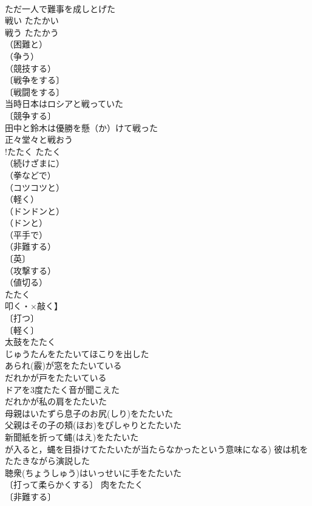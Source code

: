 \documentclass[8pt]{extreport}
\begin{document}
\begin{CJK}{UTF8}{min}
\\	ただ一人で難事を成しとげた 
\\	戦い	たたかい	
\\	戦う	たたかう	
\\	（困難と）
\\	（争う）
\\	（競技する）
\\	〔戦争をする〕
\\	〔戦闘をする〕
\\	当時日本はロシアと戦っていた 
\\	〔競争する〕
\\	田中と鈴木は優勝を懸（か）けて戦った 
\\	正々堂々と戦おう 
\\	!たたく	たたく	
\\	（続けざまに）
\\	（拳などで）
\\	（コツコツと）
\\	（軽く）
\\	（ドンドンと）
\\	（ドンと）
\\	（平手で）
\\	（非難する）
\\	〔英〕
\\	（攻撃する）
\\	（値切る）
\\	たたく
\\	叩く・×敲く】 
\\	〔打つ〕
\\	〔軽く〕
\\	太鼓をたたく 
\\	じゅうたんをたたいてほこりを出した 
\\	あられ(霰)が窓をたたいている 
\\	だれかが戸をたたいている 
\\	ドアを3度たたく音が聞こえた 
\\	だれかが私の肩をたたいた 
\\	母親はいたずら息子のお尻(しり)をたたいた 
\\	父親はその子の頬(ほお)をぴしゃりとたたいた 
\\	新聞紙を折って蝿(はえ)をたたいた 
\\	が入ると，蝿を目掛けてたたいたが当たらなかったという意味になる) 彼は机をたたきながら演説した 
\\	聴衆(ちょうしゅう)はいっせいに手をたたいた 
\\	〔打って柔らかくする〕 肉をたたく 
\\	〔非難する〕

\end{CJK}
\end{document}
